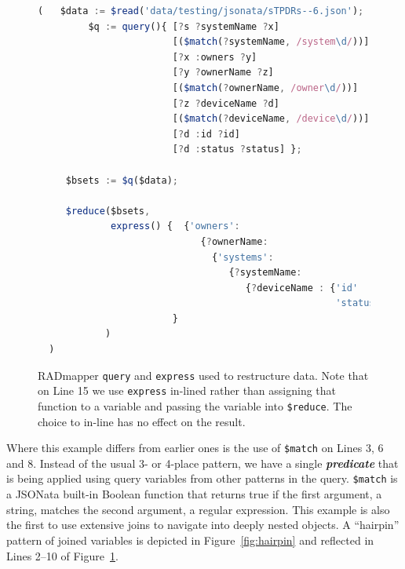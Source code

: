 \documentclass[10pt,letterpaper]{article} %
\newcommand{\stt}[1]{\texttt{#1}} %
\newcommand{\bdef}[1]{\textbf{\textit{#1}}}
\begin{document}
\begin{figure}[H]
  \caption{RADmapper \stt{query} and \stt{express} used to restructure data.
    Note that on Line 15 we use \stt{express} in-lined rather than assigning that function to a variable and passing the variable into \stt{\$reduce}. The choice to in-line has no effect on the result.}
 \label{code:restruct}
\begin{lstlisting}[language=JavaScript,basicstyle=\ttfamily\scriptsize,numberstyle=\scriptsize]
  (   $data := $read('data/testing/jsonata/sTPDRs--6.json');
         $q := query(){ [?s ?systemName ?x]
                        [($match(?systemName, /system\d/))]
                        [?x :owners ?y]
                        [?y ?ownerName ?z]
                        [($match(?ownerName, /owner\d/))]
                        [?z ?deviceName ?d]
                        [($match(?deviceName, /device\d/))]
                        [?d :id ?id]
                        [?d :status ?status] };

     $bsets := $q($data);

     $reduce($bsets,
             express() {  {'owners':
                             {?ownerName:
                               {'systems':
                                  {?systemName:
                                     {?deviceName : {'id'     : ?id,
                                                     'status' : ?status}}}}}}
                        }
            )
  )
\end{lstlisting}
\end{figure} \vspace{-3em}

Where this example differs from earlier ones is the use of \stt{\$match} on Lines 3, 6 and 8.
Instead of the usual 3- or 4-place pattern, we have a single \bdef{predicate} that is being applied using query variables from other patterns in the query.
\stt{\$match} is a JSONata built-in Boolean function that returns true if the first argument, a string, matches the second argument, a regular expression.
This example is also the first to use extensive joins to navigate into deeply nested objects.
A ``hairpin'' pattern of joined variables is depicted in Figure~\ref{fig:hairpin} and reflected in Lines 2--10 of Figure~\ref{code:restruct}.
\end{document}
